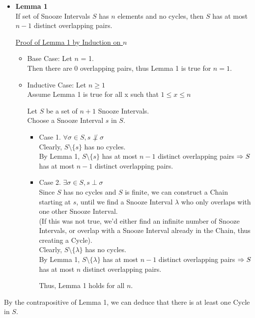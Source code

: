 \documentclass[fleqn]{article}
\newcommand{\set}[1]{\lbrace #1 \rbrace}
\newcommand{\ioverlap}{\perp}
\begin{document}
\begin{itemize}
  \item \textbf{Lemma 1}\\
        If set of Snooze Intervals $S$ has $n$ elements and no cycles,
        then $S$ has at most $n-1$ distinct overlapping pairs.

        \underline{Proof of Lemma 1 by Induction on $n$}
        \begin{itemize}
          \item Base Case: Let $n$ = 1.\\
                Then there are 0 overlapping pairs, thus
                Lemma 1 is true for $n=1$.
          \item Inductive Case: Let $n \geq 1$\\
                Assume Lemma 1 is true for all x such that $1 \leq x \leq n$

                Let $S$ be a set of $n+1$ Snooze Intervals.\\
                Choose a Snooze Interval $s$ in $S$.

                \begin{itemize}
                  \item Case 1. $\forall \sigma \in S, s \not\ioverlap \sigma$\\
                        Clearly, $S \setminus \set{s}$ has no cycles.\\
                        By Lemma 1, $S \setminus \set{s}$ has at most 
                        $n-1$ distinct overlapping pairs $\Rightarrow\\
                        S$ has at most $n-1$ distinct overlapping pairs.
                  \item Case 2. $\exists \sigma \in S, s \ioverlap \sigma$\\
                        Since $S$ has no cycles and $S$ is finite, we
                        can construct a Chain starting at $s$, until
                        we find a Snooze Interval $\lambda$ who only
                        overlaps with one other Snooze Interval.\\
                        (If this was not true, we'd either find an
                         infinite number of Snooze Intervals, or 
                         overlap with a Snooze Interval already in 
                         the Chain, thus creating a Cycle).\\
                        Clearly, $S \setminus \set{\lambda}$ has no cycles.\\
                        By Lemma 1, $S \setminus \set{\lambda}$ has at
                        most $n-1$ distinct overlapping pairs $\Rightarrow\\
                        S$ has at most $n$ distinct overlapping pairs.
                        
                        Thus, Lemma 1 holds for all $n$.
                \end{itemize}
        \end{itemize}

\end{itemize}
By the contrapositive of Lemma 1, we can deduce that there is at least one Cycle in $S$. 
\end{document}
